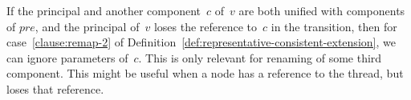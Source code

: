
\begin{improve} 
If the principal and another component~$c$ of~$v$ are both unified with
components of $pre$, and the principal of~$v$ loses the reference to~$c$ in
the transition, then for case~\ref{clause:remap-2} of
Definition~\ref{def:representative-consistent-extension}, we can ignore
parameters of~$c$.  This is only relevant for renaming of some third
component.
%
This might be useful when a node has a reference to the thread, but loses
that reference.
\end{improve}
